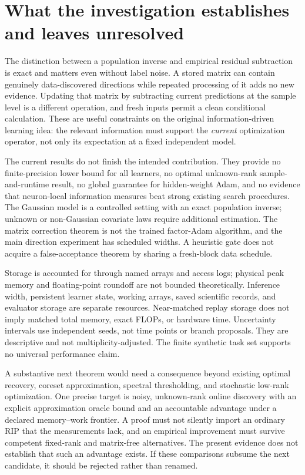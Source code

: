 \documentclass[11pt]{article}
\theoremstyle{remark}\newtheorem{remark}[theorem]{Remark}
\begin{document}





\section{What the investigation establishes and leaves unresolved}
\label{sec:limits}
The distinction between a population inverse and empirical residual
subtraction is exact and matters even without label noise. A stored matrix
can contain genuinely data-discovered directions while repeated processing
of it adds no new evidence. Updating that matrix by subtracting current
predictions at the sample level is a different operation, and fresh inputs
permit a clean conditional calculation. These are useful constraints on the
original information-driven learning idea: the relevant information must
support the \emph{current} optimization operator, not only its expectation
at a fixed independent model.

The current results do not finish the intended contribution. They provide
no finite-precision lower bound for all learners, no optimal unknown-rank
sample-and-runtime result, no global guarantee for hidden-weight Adam, and
no evidence that neuron-local information measures beat strong existing
search procedures. The Gaussian model is a controlled setting with an exact
population inverse; unknown or non-Gaussian covariate laws require additional
estimation. The matrix correction theorem is not the trained factor-Adam
algorithm, and the main direction experiment has scheduled widths. A
heuristic gate does not acquire a false-acceptance theorem by sharing a
fresh-block data schedule.

Storage is accounted for through named arrays and access logs; physical
peak memory and floating-point roundoff are not bounded theoretically.
Inference width, persistent learner state, working arrays, saved scientific
records, and evaluator storage are separate resources. Near-matched replay
storage does not imply matched total memory, exact FLOPs, or hardware time.
Uncertainty intervals use independent seeds, not time points or branch
proposals. They are descriptive and not multiplicity-adjusted. The finite
synthetic task set supports no universal performance claim.

A substantive next theorem would need a consequence beyond existing
optimal recovery, coreset approximation, spectral thresholding, and
stochastic low-rank optimization. One precise target is noisy,
unknown-rank online discovery with an explicit approximation oracle bound
and an accountable advantage under a declared memory--work frontier. A
proof must not silently import an ordinary RIP that the measurements lack,
and an empirical improvement must survive competent fixed-rank and
matrix-free alternatives. The present evidence does not establish that
such an advantage exists. If these comparisons subsume the next candidate,
it should be rejected rather than renamed.
\end{document}
